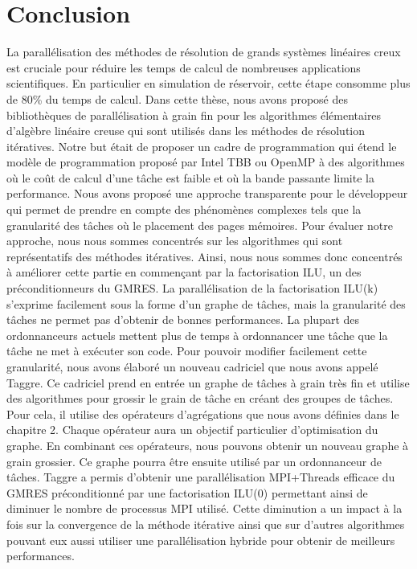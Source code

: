 \section{Conclusion}
%
%
La parallélisation des méthodes de résolution de grands systèmes linéaires creux est cruciale pour réduire les temps de calcul de nombreuses applications scientifiques.
%
En particulier en simulation de réservoir, cette étape consomme plus de 80\% du temps de calcul.
%
Dans cette thèse, nous avons proposé des bibliothèques de parallélisation à grain fin pour les algorithmes élémentaires d'algèbre linéaire creuse qui sont utilisés dans les méthodes de résolution itératives.
%
Notre but était de proposer un cadre de programmation qui étend le modèle de programmation proposé par Intel TBB ou OpenMP à des algorithmes où le coût de calcul d'une tâche est faible et où la bande passante limite la performance.
%
Nous avons proposé une approche transparente pour le développeur qui permet de prendre en compte des phénomènes complexes tels que la granularité des tâches où le placement des pages mémoires.
%
Pour évaluer notre approche, nous nous sommes concentrés sur les algorithmes qui sont représentatifs des méthodes itératives.
%
Ainsi, nous nous sommes donc concentrés à améliorer cette partie en commençant par la factorisation ILU, un des préconditionneurs du GMRES.
%
La parallélisation de la factorisation ILU(k) s'exprime facilement sous la forme d'un graphe de tâches, mais la granularité des tâches ne permet pas d'obtenir de bonnes performances.
%
La plupart des ordonnanceurs actuels mettent plus de temps à ordonnancer une tâche que la tâche ne met à exécuter son code.
%
Pour pouvoir modifier facilement cette granularité, nous avons élaboré un nouveau cadriciel que nous avons appelé Taggre.
%
Ce cadriciel prend en entrée un graphe de tâches à grain très fin et utilise des algorithmes pour grossir le grain de tâche en créant des groupes de tâches.
%
Pour cela, il utilise des opérateurs d'agrégations que nous avons définies dans le chapitre 2.
%
Chaque opérateur aura un objectif particulier d'optimisation du graphe.
%
En combinant ces opérateurs, nous pouvons obtenir un nouveau graphe à grain grossier.
%
Ce graphe pourra être ensuite utilisé par un ordonnanceur de tâches.
%
Taggre a permis d'obtenir une parallélisation MPI+Threads efficace du GMRES préconditionné par une factorisation ILU(0) permettant ainsi de diminuer le nombre de processus MPI utilisé.
%
Cette diminution a un impact à la fois sur la convergence de la méthode itérative ainsi que sur d'autres algorithmes pouvant eux aussi utiliser une parallélisation hybride pour obtenir de meilleurs performances.




